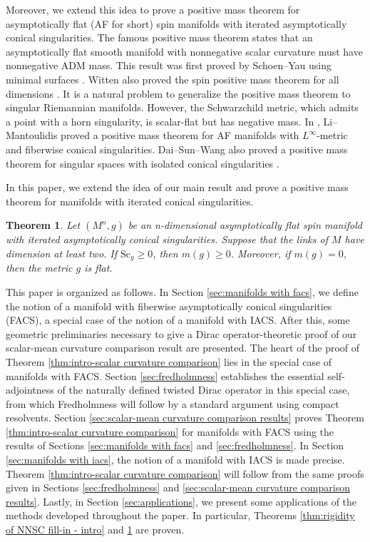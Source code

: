 \documentclass[12pt, reqno]{amsart}
\theoremstyle{plain} %
\newtheorem{theorem}{Theorem}[section]
\theoremstyle{definition}
\theoremstyle{remark}
\numberwithin{equation}{section}
\newcommand{\Sc}{\mathrm{Sc}}
\begin{document}
Moreover, we extend this idea to prove a positive mass theorem for asymptotically flat (AF for short) spin manifolds with iterated asymptotically conical singularities. The famous positive mass theorem states that an asymptotically flat smooth manifold with nonnegative scalar curvature must have nonnegative ADM mass. This result was first proved by Schoen--Yau using minimal surfaces \cite{SchoenYauPMT}. Witten also proved the spin positive mass theorem for all dimensions \cite{MR626707}. It is a natural problem to generalize the positive mass theorem to singular Riemannian manifolds. However, the Schwarzchild metric, which admits a point with a horn singularity, is scalar-flat but has negative mass. In \cite{MR3961306}, Li--Mantoulidis proved a positive mass theorem for AF manifolds with $L^\infty$-metric and fiberwise conical singularities. Dai--Sun--Wang also proved a positive mass theorem for singular spaces with isolated conical singularities \cite{MR4880457,DaiSunWang}.

In this paper, we extend the idea of our main result and prove a positive mass theorem for manifolds with iterated conical singularities.
\begin{theorem}\label{thm:intro-positive mass theorem for iterated asymptotically conical spaces}
    Let \((M^n,g)\) be an n-dimensional asymptotically flat spin manifold with iterated asymptotically conical singularities.
    Suppose that the links of \(M\) have dimension at least two.
    If \(\Sc_g \geq 0\), then \(m(g) \geq 0\).
    Moreover, if \(m(g) = 0\), then the metric \(g\) is flat.
\end{theorem}

This paper is organized as follows.
In Section \ref{sec:manifolds with facs}, we define the notion of a manifold with fiberwise asymptotically conical singularities (FACS), a special case of the notion of a manifold with IACS.
After this, some geometric preliminaries necessary to give a Dirac operator-theoretic proof of our scalar-mean curvature comparison result are presented.
The heart of the proof of Theorem \ref{thm:intro-scalar curvature comparison} lies in the special case of manifolds with FACS. 
Section \ref{sec:fredholmness} establishes the essential self-adjointness of the naturally defined twisted Dirac operator in this special case, from which Fredholmness will follow by a standard argument using compact resolvents.
Section \ref{sec:scalar-mean curvature comparison results} proves Theorem \ref{thm:intro-scalar curvature comparison} for manifolds with FACS using the results of Sections \ref{sec:manifolds with facs} and \ref{sec:fredholmness}.
In Section \ref{sec:manifolds with iacs}, the notion of a manifold with IACS is made precise. Theorem \ref{thm:intro-scalar curvature comparison} will follow from the same proofs given in Sections \ref{sec:fredholmness} and \ref{sec:scalar-mean curvature comparison results}.
Lastly, in Section \ref{sec:applications}, we present some applications of the methods developed throughout the paper. In particular, Theorems \ref{thm:rigidity of NNSC fill-in - intro} and \ref{thm:intro-positive mass theorem for iterated asymptotically conical spaces} are proven.
\end{document}
